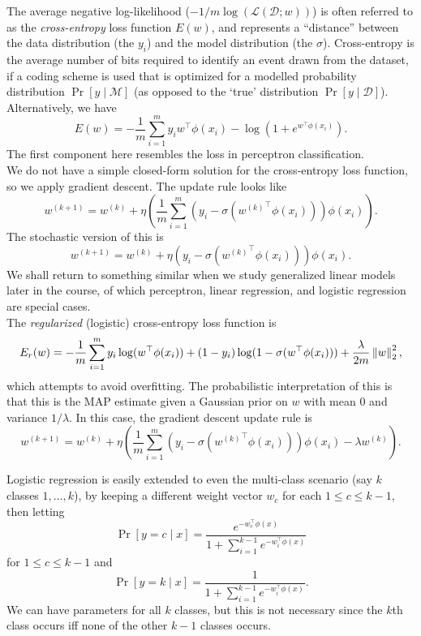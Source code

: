 \documentclass{article}
\begin{document}
		The average negative log-likelihood ($- 1/m \log(\mathcal{L}(\mathcal{D};w))$) is often referred to as the \emph{cross-entropy} loss function $E(w)$, and represents a ``distance'' between the data distribution (the $y_i$) and the model distribution (the $\sigma$). Cross-entropy is the average number of bits required to identify an event drawn from the dataset, if a coding scheme is used that is optimized for a modelled probability distribution $\Pr[y\mid\mathcal{M}]$ (as opposed to the `true' distribution $\Pr[y\mid\mathcal{D}]$).\\
		Alternatively, we have
		\[ E(w) = - \frac{1}{m} \sum_{i=1}^m y_i w^\top \phi(x_i) - \log(1 + e^{w^\top\phi(x_i)}). \]
		The first component here resembles the loss in perceptron classification.\\
		We do not have a simple closed-form solution for the cross-entropy loss function, so we apply gradient descent. The update rule looks like
		\[ w^{(k+1)} = w^{(k)} + \eta \left(\frac{1}{m} \sum_{i=1}^m (y_i - \sigma({w^{(k)}}^\top\phi(x_i))) \phi(x_i) \right). \]
		The stochastic version of this is
		\[ w^{(k+1)} = w^{(k)} + \eta (y_i - \sigma({w^{(k)}}^\top\phi(x_i))) \phi(x_i). \]
		We shall return to something similar when we study generalized linear models later in the course, of which perceptron, linear regression, and logistic regression are special cases.\\
		The \emph{regularized} (logistic) cross-entropy loss function is
		\[ E_r(w) = -\frac{1}{m} \sum_{i=1}^m y_i \log(w^\top \phi(x_i)) + (1 - y_i) \log(1-\sigma(w^\top\phi(x_i))) + \frac{\lambda}{2m}\left\lVert w\right\rVert_2^2, \]
		which attempts to avoid overfitting. The probabilistic interpretation of this is that this is the MAP estimate given a Gaussian prior on $w$ with mean $0$ and variance $1/\lambda$. In this case, the gradient descent update rule is
		\[ w^{(k+1)} = w^{(k)} + \eta \left(\frac{1}{m} \sum_{i=1}^m (y_i - \sigma({w^{(k)}}^\top\phi(x_i))) \phi(x_i) - \lambda w^{(k)} \right). \]

		Logistic regression is easily extended to even the multi-class scenario (say $k$ classes $1,\ldots,k$), by keeping a different weight vector $w_{c}$ for each $1\le c\le k-1$, then letting
		\[ \Pr[y=c\mid x] = \frac{e^{-w_c^\top \phi(x)}}{1 + \sum_{i=1}^{k-1} e^{-w_i^\top \phi(x)}} \]
		for $1\le c\le k-1$ and
		\[ \Pr[y=k\mid x] = \frac{1}{1 + \sum_{i=1}^{k-1} e^{-w_i^\top \phi(x)}}. \]
		We can have parameters for all $k$ classes, but this is not necessary since the $k$th class occurs iff none of the other $k-1$ classes occurs.

% 
% 
\end{document}
